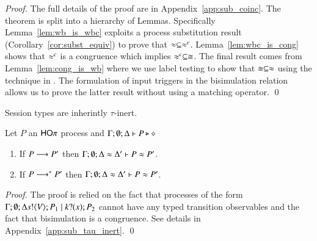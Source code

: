\begin{proof}
	The full details of the proof are in Appendix~\ref{app:sub_coinc}.
	The theorem is split into a hierarchy of Lemmas. Specifically
	Lemma~\ref{lem:wb_is_wbc} exploits a process substitution result
	(Corollary~\ref{cor:subst_equiv}) to prove that $\approx \subseteq \approx^{c}$.
	Lemma~\ref{lem:wbc_is_cong} shows that $\approx^{c}$ is a congruence
	which implies $\approx^{c} \subseteq \cong$.
	The final result comes from Lemma~\ref{lem:cong_is_wb} where
	we use label testing to show that $\cong \subseteq \approx$ using
	the technique in \cite{aaa}. The formulation of input
	triggers in the bisimulation relation allows us to prove
	the latter result without using a matching operator.
	\qed
\end{proof}

Session types are inherintly $\tau$-inert.

\begin{lemma}\rm
	\label{lem:tau_inert}
	Let $P$ an $\mathsf{HO}\pi$ process
	and $\Gamma; \emptyset; \Delta \vdash P \triangleright \diamond$
	\begin{enumerate}
		\item	If $P \longrightarrow P'$ then $\Gamma; \emptyset; \Delta \approx \Delta' \vdash P \approx P'$.
		\item	If $P \longrightarrow^* P'$ then $\Gamma; \emptyset; \Delta \approx \Delta' \vdash P \approx P'$.
	\end{enumerate}
\end{lemma}

\begin{proof}
	The proof is relied on the fact that processes of the
	form $\Gamma; \emptyset; \Delta s ! \langle V \rangle ; P_1 \;|\; k ? (x) ; P_2$
	cannot have any typed transition observables and the fact
	that bisimulation is a congruence.
	See details in Appendix~\ref{app:sub_tau_inert}.
	\qed
\end{proof}


